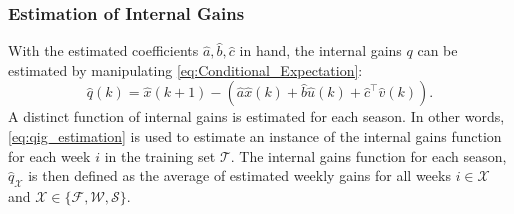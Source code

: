 \subsubsection{Estimation of Internal Gains}
With the estimated coefficients $\hat{a}, \hat{b}, \hat{c}$ in hand, the internal gains $q$ can be estimated by manipulating \eqref{eq:Conditional_Expectation}: 
\begin{equation}\label{eq:qig_estimation}
\hat{q}(k) = \hat{x}(k+1) - \left(\hat{a}\hat{x}(k) + \hat{b}\hat{u}(k) + \hat{c}^\top \hat{v}(k)\right).
\end{equation}
A distinct function of internal gains is estimated for each season. In other words, \eqref{eq:qig_estimation} is used to estimate an instance of the internal gains function for each week $i$ in the training set $\mathcal{T}$. The internal gains function for each season, $\hat{q}_{\mathcal{X}}$ is then defined as the average of estimated weekly gains for all weeks $i \in \mathcal{X}$ and $\mathcal{X} \in \{ \mathcal{F}, \mathcal{W}, \mathcal{S} \}$.



